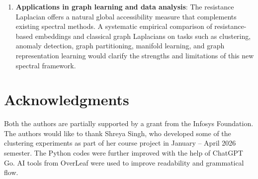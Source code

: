 \documentclass[12pt,a4paper]{amsart}
\theoremstyle{remark}
\theoremstyle{definition}
\newcommand{\1}{\mathbf{1}}
\newcommand{\0}{\mathbf{0}}
\begin{document}
\begin{enumerate}
    \item \textbf{Applications in graph learning and data analysis}: The resistance Laplacian offers a natural global accessibility measure that complements existing spectral methods. A systematic empirical comparison of resistance-based embeddings and classical graph Laplacians on tasks such as clustering, anomaly detection, graph partitioning, manifold learning, and graph representation learning would clarify the strengths and limitations of this new spectral framework.
\end{enumerate}

\section*{Acknowledgments}
Both the authors are partially supported by a grant from the Infosys Foundation. 
The authors would like to thank Shreya Singh, who developed some of the clustering experiments as part of her course project in January -- April 2026 semester. 
The Python codes were further improved with the help of  ChatGPT Go. 
AI tools from OverLeaf were used to improve readability and grammatical flow. 
















\end{document}
